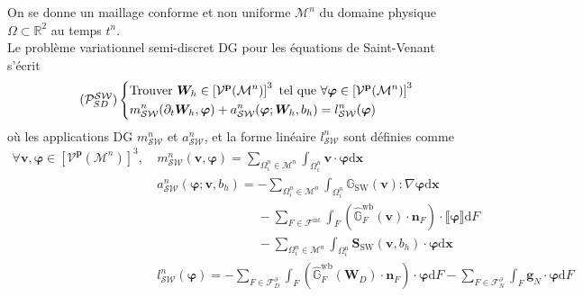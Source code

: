 \documentclass[11pt, a4paper, oneside]{report}
\begin{document}
On se donne un maillage conforme et non uniforme $\mathcal{M}^n$ du domaine physique $\Omega \subset \mathbb{R}^2$ au temps $t^n$. \\
Le problème variationnel semi-discret DG pour les équations de Saint-Venant s'écrit
\begin{equation} \tag{$\mathcal{P}_{SD}^\mathcal{SW}$} \label{eq:Probleme_variationnel_Saint_Venant}
    \left \{
    \begin{aligned}
        & \text{Trouver } \bm{W}_h \in \left[ \mathcal{V}^\mathbf{p}(\mathcal{M}^n) \right]^3 \text{ tel que } \forall \bm{\varphi} \in \left[ \mathcal{V}^\mathbf{p}(\mathcal{M}^n) \right]^3 \\
        & m_\mathcal{SW}^n(\partial_t \bm{W}_h, \bm{\varphi}) + a_\mathcal{SW}^n(\bm{\varphi}; \bm{W}_h, b_h) = l_\mathcal{SW}^n(\bm{\varphi})
    \end{aligned}
    \right .
\end{equation}
où les applications DG $m_\mathcal{SW}^n$ et $a_\mathcal{SW}^n$, et la forme linéaire $l_\mathcal{SW}^n$ sont définies comme
\begin{equation}
    \begin{aligned}
        \forall \bm{v}, \bm{\varphi} \in \left[ \mathcal{V}^\mathbf{p}(\mathcal{M}^n) \right]^3, ~
        & m_\mathcal{SW}^n(\bm{v}, \bm{\varphi}) = \sum_{\Omega_i^n \in \mathcal{M}^n} \int_{\Omega_i^n} \bm{v} \cdot \bm{\varphi} \text{d}\bm{x} \\
        & a_\mathcal{SW}^n(\bm{\varphi}; \bm{v}, b_h) = - \sum_{\Omega_i^n \in \mathcal{M}^n} \int_{\Omega_i^n} \mathbb{G}_\text{SW}(\bm{v}) : \nabla \bm{\varphi} \text{d}\bm{x} \\
        & \phantom{a_\mathcal{SW}^n(\bm{\varphi}; \bm{v}, b_h) = } - \sum_{F \in \mathcal{F}^\text{int}} \int_F \left( \widehat{\mathbb{G}}_F^\text{wb}(\bm{v}) \cdot \bm{n}_F \right) \cdot \llbracket \bm{\varphi} \rrbracket \text{d}F \\
        & \phantom{a_\mathcal{SW}^n(\bm{\varphi}; \bm{v}, b_h) = } - \sum_{\Omega_i^n \in \mathcal{M}^n} \int_{\Omega_i^n} \bm{S}_\text{SW}(\bm{v}, b_h) \cdot \bm{\varphi} \text{d}\bm{x} \\
        & l_\mathcal{SW}^n(\bm{\varphi}) = - \sum_{F \in \mathcal{F}_D^\partial} \int_F \left( \widehat{\mathbb{G}}_F^\text{wb}(\bm{W}_D) \cdot \bm{n}_F \right) \cdot \bm{\varphi} \text{d}F - \sum_{F \in \mathcal{F}_N^\partial} \int_F \bm{g}_N \cdot \bm{\varphi} \text{d}F
    \end{aligned}
\end{equation}
\end{document}
